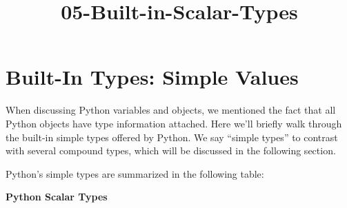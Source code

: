 \documentclass[11pt]{article}
\title{05-Built-in-Scalar-Types}
\begin{document}
    
    
    \maketitle
    
    

    
    \section{Built-In Types: Simple
Values}\label{built-in-types-simple-values}

When discussing Python variables and objects, we mentioned the fact that
all Python objects have type information attached. Here we'll briefly
walk through the built-in simple types offered by Python. We say
``simple types'' to contrast with several compound types, which will be
discussed in the following section.

Python's simple types are summarized in the following table:

\textbf{Python Scalar Types}
\end{document}
